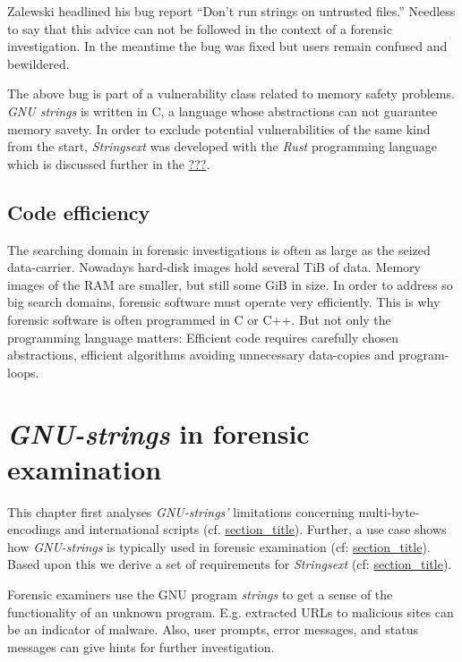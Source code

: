 Zalewski headlined his bug report ``Don't run strings on untrusted
files.'' Needless to say that this advice can not be followed in the
context of a forensic investigation. In the meantime the bug was fixed
but users remain confused and bewildered.

The above bug is part of a vulnerability class related to memory safety
problems. \emph{GNU strings} is written in C, a language whose
abstractions can not guarantee memory savety. In order to exclude
potential vulnerabilities of the same kind from the start,
\emph{Strings­ext} was developed with the \emph{Rust} programming
language which is discussed further in the
\protect\hyperlink{rust}{???}.

\hypertarget{_code_efficiency}{\subsection{Code
efficiency}\label{_code_efficiency}}

The searching domain in forensic investigations is often as large as the
seized data-carrier. Nowadays hard-disk images hold several TiB of data.
Memory images of the RAM are smaller, but still some GiB in size. In
order to address so big search domains, forensic software must operate
very efficiently. This is why forensic software is often programmed in C
or C++. But not only the programming language matters: Efficient code
requires carefully chosen abstractions, efficient algorithms avoiding
un­ne­ces­sary data-copies and program-loops.

\hypertarget{strings-and-forensics}{\section{\texorpdfstring{\emph{GNU-strings}
in forensic
examination}{GNU-strings in forensic examination}}\label{strings-and-forensics}}

This chapter first analyses \emph{GNU-strings'} limitations concerning
multi-byte-encodings and international scripts (cf.
\protect\hyperlink{test-case-strings}{section\_title}). Further, a use
case shows how \emph{GNU-strings} is typically used in forensic
examination (cf: \protect\hyperlink{_typical_usage}{section\_title}).
Based upon this we derive a set of requirements for \emph{Strings­ext}
(cf:
\protect\hyperlink{_requirements_derived_from_typical_usage}{section\_title}).

Forensic examiners use the GNU program \emph{strings} to get a sense of
the functionality of an unknown program. E.g. extracted URLs to
malicious sites can be an indicator of malware. Also, user prompts,
error messages, and status messages can give hints for further
investigation.

